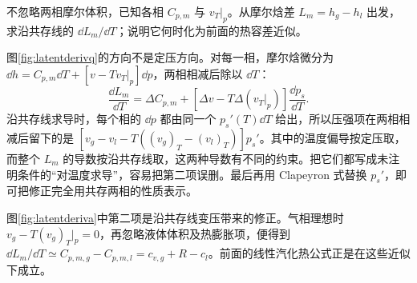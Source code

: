 \begin{exercise}[共存线上潜热的局部变化]
不忽略两相摩尔体积，已知各相 $C_{p,m}$ 与 $v_T|_p$。从摩尔焓差 $L_m=h_g-h_l$ 出发，求沿共存线的 $\dd L_m/\dd T$；说明它何时化为前面的热容差近似。
\end{exercise}
\begin{solution}
图\ref{fig:latentderivq}的方向不是定压方向。对每一相，摩尔焓微分为 $\dd h=C_{p,m}\dd T+[v-Tv_T|_p]\dd p$，两相相减后除以 $\dd T$：
\[
 \frac{\dd L_m}{\dd T}=\Delta C_{p,m}
 +\left[\Delta v-T\Delta(v_T|_p)\right]\frac{\dd p_s}{\dd T}.
\]
沿共存线求导时，每个相的 $\dd p$ 都由同一个 $p_s'(T)\dd T$ 给出，所以压强项在两相相减后留下的是 $[v_g-v_l-T((v_g)_T-(v_l)_T)]p_s'$。其中的温度偏导按定压取，而整个 $L_m$ 的导数按沿共存线取，这两种导数有不同的约束。把它们都写成未注明条件的“对温度求导”，容易把第二项误删。最后再用 Clapeyron 式替换 $p_s'$，即可把修正完全用共存两相的性质表示。

图\ref{fig:latentderiva}中第二项是沿共存线变压带来的修正。气相理想时 $v_g-T(v_g)_T|_p=0$，再忽略液体体积及热膨胀项，便得到 $\dd L_m/\dd T\simeq C_{p,m,g}-C_{p,m,l}=c_{v,g}+R-c_l$。前面的线性汽化热公式正是在这些近似下成立。
\end{solution}
